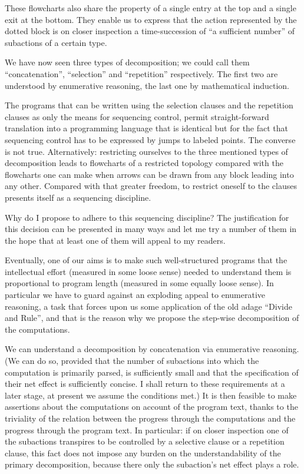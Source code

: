 These flowcharts also share the property of a single entry at the top and a single exit at the bottom. They enable us to express that the action represented by the dotted block is on closer inspection a time-succession of ``a sufficient number'' of subactions of a certain type.

We have now seen three types of decomposition; we could call them ``concatenation'', ``selection'' and ``repetition'' respectively. The first two are understood by enumerative reasoning, the last one by mathematical induction. 

The programs that can be written using the selection clauses and the repetition clauses as only the means for sequencing control, permit straight-forward translation into a programming language that is identical but for the fact that sequencing control has to be expressed by jumps to labeled points. The converse is not true. Alternatively: restricting ourselves to the three mentioned types of decomposition leads to flowcharts of a restricted topology compared with the flowcharts one can make when arrows can be drawn from any block leading into any other. Compared with that greater freedom, to restrict oneself to the clauses presents itself as a sequencing discipline.

Why do I propose to adhere to this sequencing discipline? The justification for this decision can be presented in many ways and let me try a number of them in the hope that at least one of them will appeal to my readers.

Eventually, one of our aims is to make such well-structured programs that the intellectual effort (measured in some loose sense) needed to understand them is proportional to program length (measured in some equally loose sense). In particular we have to guard against an exploding appeal to enumerative reasoning, a task that forces upon us some application of the old adage ``Divide and Rule'', and that is the reason why we propose the step-wise decomposition of the computations.

We can understand a decomposition by concatenation via enumerative reasoning. (We can do so, provided that the number of subactions into which the computation is primarily parsed, is sufficiently small and that the specification of their net effect is sufficiently concise. I shall return to these requirements at a later stage, at present we assume the conditions met.) It is then feasible to make assertions about the computations on account of the program text, thanks to the triviality of the relation between the progress through the computations and the progress through the program text. In particular: if on closer inspection one of the subactions transpires to be controlled by a selective clause or a repetition clause, this fact does not impose any burden on the understandability of the primary decomposition, because there only the subaction's net effect plays a role.

